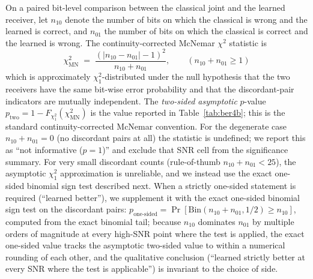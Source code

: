 On a paired bit-level comparison between the classical joint and the learned receiver, let $n_{10}$ denote the number of bits on which the classical is wrong and the learned is correct, and $n_{01}$ the number of bits on which the classical is correct and the learned is wrong.
The continuity-corrected McNemar $\chi^2$ statistic is
\begin{equation*}
\chi^2_\text{MN} \;=\; \frac{(|n_{10} - n_{01}| - 1)^2}{n_{10} + n_{01}}, \qquad (n_{10} + n_{01} \geq 1)
\end{equation*}
which is approximately $\chi^2_1$-distributed under the null hypothesis that the two receivers have the same bit-wise error probability and that the discordant-pair indicators are mutually independent.
The \emph{two-sided asymptotic} $p$-value $p_\text{two} = 1 - F_{\chi^2_1}(\chi^2_\text{MN})$ is the value reported in Table~\ref{tab:ber4b}; this is the standard continuity-corrected McNemar convention.
For the degenerate case $n_{10} + n_{01} = 0$ (no discordant pairs at all) the statistic is undefined; we report this as ``not informative ($p = 1$)'' and exclude that SNR cell from the significance summary.
For very small discordant counts (rule-of-thumb $n_{10} + n_{01} < 25$), the asymptotic $\chi^2_1$ approximation is unreliable, and we instead use the exact one-sided binomial sign test described next.
When a strictly one-sided statement is required (``learned better''), we supplement it with the exact one-sided binomial sign test on the discordant pairs: $p_\text{one-sided} = \Pr[\text{Bin}(n_{10} + n_{01}, 1/2) \geq n_{10}]$, computed from the exact binomial tail; because $n_{10}$ dominates $n_{01}$ by multiple orders of magnitude at every high-SNR point where the test is applied, the exact one-sided value tracks the asymptotic two-sided value to within a numerical rounding of each other, and the qualitative conclusion (``learned strictly better at every SNR where the test is applicable'') is invariant to the choice of side.

